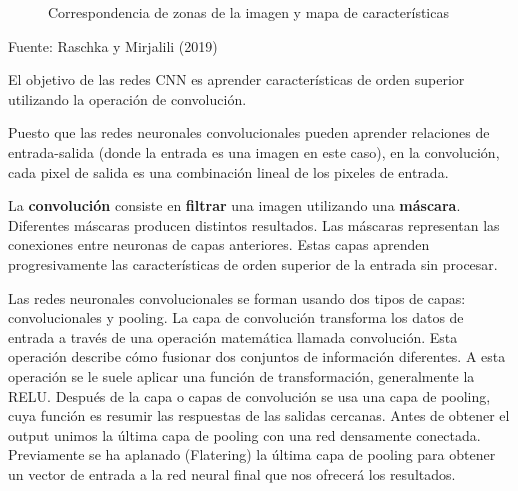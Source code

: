 \documentclass[
  a4paper,
  DIV=11,
  numbers=noendperiod]{scrreprt}
\begin{document}
\begin{figure}


\caption{\label{fig-correspondencia-features}Correspondencia de zonas de
la imagen y mapa de características}

\end{figure}%

Fuente: Raschka y Mirjalili (2019)

El objetivo de las redes CNN es aprender características de orden
superior utilizando la operación de convolución.

Puesto que las redes neuronales convolucionales pueden aprender
relaciones de entrada-salida (donde la entrada es una imagen en este
caso), en la convolución, cada pixel de salida es una combinación lineal
de los pixeles de entrada.

La \textbf{convolución} consiste en \textbf{filtrar} una imagen
utilizando una \textbf{máscara}. Diferentes máscaras producen distintos
resultados. Las máscaras representan las conexiones entre neuronas de
capas anteriores. Estas capas aprenden progresivamente las
características de orden superior de la entrada sin procesar.

Las redes neuronales convolucionales se forman usando dos tipos de
capas: convolucionales y pooling. La capa de convolución transforma los
datos de entrada a través de una operación matemática llamada
convolución. Esta operación describe cómo fusionar dos conjuntos de
información diferentes. A esta operación se le suele aplicar una función
de transformación, generalmente la RELU. Después de la capa o capas de
convolución se usa una capa de pooling, cuya función es resumir las
respuestas de las salidas cercanas. Antes de obtener el output unimos la
última capa de pooling con una red densamente conectada. Previamente se
ha aplanado (Flatering) la última capa de pooling para obtener un vector
de entrada a la red neural final que nos ofrecerá los resultados.
\end{document}
